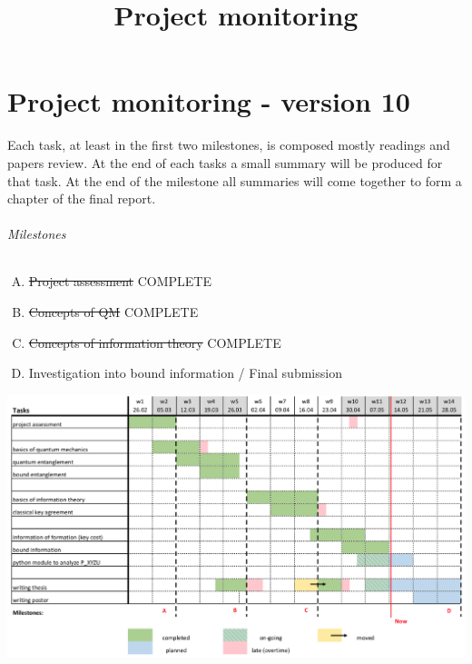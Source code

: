\documentclass{article}
\title{Project monitoring}
\begin{document}
\part*{Project monitoring - version 10}
Each task, at least in the first two milestones, is composed mostly readings and papers review.
At the end of each tasks a small summary will be produced for that task. 
At the end of the milestone all summaries will come together to form a chapter of the final report. \\

\paragraph*{Milestones}
\begin{enumerate}[A)]
\item \sout{Project assessment} COMPLETE 
\item \sout{Concepts of QM} COMPLETE
\item \sout{Concepts of information theory} COMPLETE
\item Investigation into bound information / Final submission
\end{enumerate}

\centerline{
	\includegraphics[scale=0.5]{gantt-10.png}
}
\end{document}
